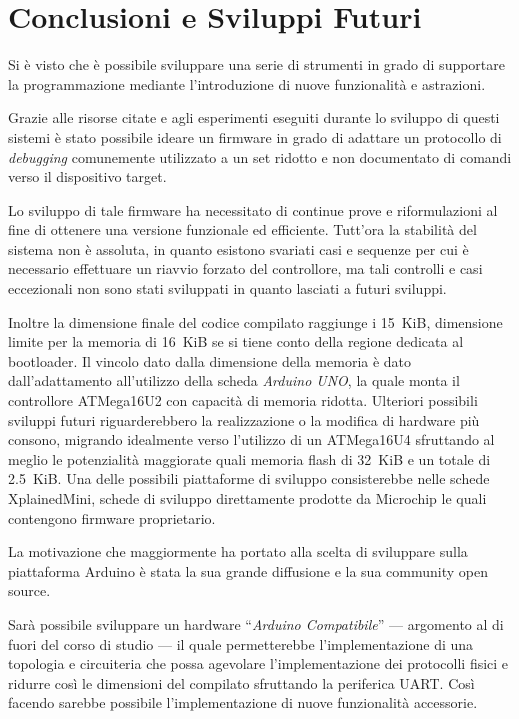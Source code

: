 \chapter*{Conclusioni e Sviluppi Futuri}

Si è visto che è possibile sviluppare una serie di strumenti in grado di supportare la programmazione mediante l'introduzione di nuove funzionalità e astrazioni.

Grazie alle risorse citate e agli esperimenti eseguiti durante lo sviluppo di questi sistemi è stato possibile ideare un firmware in grado di adattare un protocollo di \textit{debugging} comunemente utilizzato a un set ridotto e non documentato di comandi verso il dispositivo target.

Lo sviluppo di tale firmware ha necessitato di continue prove e riformulazioni al fine di ottenere una versione funzionale ed efficiente. Tutt'ora la stabilità del sistema non è assoluta, in quanto esistono svariati casi e sequenze per cui è necessario effettuare un riavvio forzato del controllore, ma tali controlli e casi eccezionali non sono stati sviluppati in quanto lasciati a futuri sviluppi.

Inoltre la dimensione finale del codice compilato raggiunge i \SI{15}{KiB}, dimensione limite per la memoria di \SI{16}{KiB} se si tiene conto della regione dedicata al bootloader. Il vincolo dato dalla dimensione della memoria è dato dall'adattamento all'utilizzo della scheda \textit{Arduino UNO}, la quale monta il controllore ATMega16U2 con capacità di memoria ridotta. Ulteriori possibili sviluppi futuri riguarderebbero la realizzazione o la modifica di hardware più consono, migrando idealmente verso l'utilizzo di un ATMega16U4 sfruttando al meglio le potenzialità maggiorate quali memoria flash di \SI{32}{KiB} e un totale di \SI{2.5}{KiB}\cite{avr:m16u4}. Una delle possibili piattaforme di sviluppo consisterebbe nelle schede XplainedMini\cite{avr:xplainedmini}, schede di sviluppo direttamente prodotte da Microchip le quali contengono firmware proprietario.

La motivazione che maggiormente ha portato alla scelta di sviluppare sulla piattaforma Arduino è stata la sua grande diffusione e la sua community open source.

Sarà possibile sviluppare un hardware ``\textit{Arduino Compatibile}'' --- argomento al di fuori del corso di studio --- il quale permetterebbe l'implementazione di una topologia e circuiteria che possa agevolare l'implementazione dei protocolli fisici e ridurre così le dimensioni del compilato sfruttando la periferica UART.\@
Così facendo sarebbe possibile l'implementazione di nuove funzionalità accessorie.

